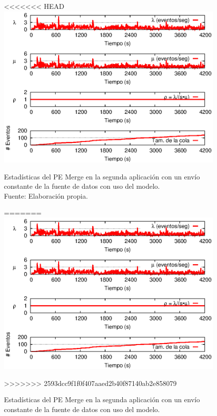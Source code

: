 \begin{figure}[!ht]
<<<<<<< HEAD
    \centering
    \captionsetup{justification=centering}
    \includegraphics[scale=1]{images/exp/app2/uniform/cm/statusMergePE.eps}
    \caption[Estadísticas del PE Merge en la segunda aplicación con un envío constante de la fuente de datos con uso del modelo.]{Estadísticas del PE Merge en la segunda aplicación con un envío constante de la fuente de datos con uso del modelo.\\Fuente: Elaboración propia.}
=======
\centering
    \includegraphics[scale=1.1]{images/exp/app2/uniform/cm/statusMergePE.eps}
    \caption{Estad\'isticas del PE Merge en la segunda aplicaci\'on con un env\'io constante de la fuente de datos con uso del modelo.}
>>>>>>> 2593dcc9f1f0f407aaed2b40f87140ab2e858079
    \label{fig:app2-uniform-statusMergePE-cm}
\end{figure}

